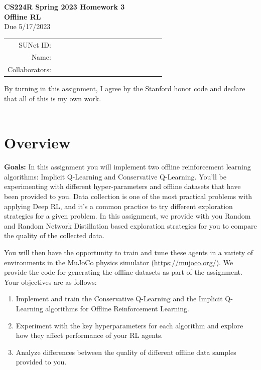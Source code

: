 \documentclass[12pt]{article}
\begin{document}
\begin{center}
{\Large \textbf{CS224R Spring 2023 Homework 3 \\ Offline RL}}
\\ {\large Due 5/17/2023}

\begin{tabular}{rl}
SUNet ID: & $\hspace{6cm}$\\
Name: & \\
Collaborators: & 
\end{tabular}
\end{center}

\noindent By turning in this assignment, I agree by the Stanford honor code and declare
that all of this is my own work. \\
\\

\section*{Overview}

\textbf{Goals:} In this assignment you will implement two offline reinforcement learning algorithms: Implicit Q-Learning and Conservative Q-Learning. You'll be experimenting with different hyper-parameters and offline datasets that have been provided to you. Data collection is one of the most practical problems with applying Deep RL, and it's a common practice to try different exploration strategies for a given problem. In this assignment, we provide with you Random and Random Network Distillation based exploration strategies for you to compare the quality of the collected data.


You will then have the opportunity to train and tune these agents in a variety of environments in the MuJoCo physics simulator (\url{https://mujoco.org/}). 
We provide the code for generating the offline datasets as part of the assignment. Your objectives are as follows:

\begin{enumerate} 
    \item Implement and train the Conservative Q-Learning and the Implicit Q-Learning algorithms for Offline Reinforcement Learning.
    \item Experiment with the key hyperparameters for each algorithm and explore how they affect performance of your RL agents.
    \item Analyze differences between the quality of different offline data samples provided to you. 
\end{enumerate}
\end{document}
